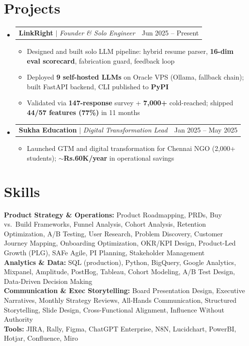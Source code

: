 \documentclass[a4paper,10pt]{article}
\makeatletter
\newcommand{\resumeItem}[1]{
  \item\small{#1\vspace{-2pt}}
}
\newcommand{\resumeProjectHeading}[2]{
  \item
  \begin{tabular*}{0.97\textwidth}{l@{\extracolsep{\fill}}r}
    \small#1 & #2 \\
  \end{tabular*}\vspace{-7pt}
}
\newcommand{\resumeSubHeadingListStart}{\begin{itemize}[leftmargin=0.15in, label={}]}
\newcommand{\resumeSubHeadingListEnd}{\end{itemize}}
\newcommand{\resumeItemListStart}{\begin{itemize}\parfillskip=0pt}
\newcommand{\resumeItemListEnd}{\end{itemize}\vspace{-5pt}}
\makeatother
\begin{document}
\section{Projects}
\resumeSubHeadingListStart

  \resumeProjectHeading
    {\textbf{LinkRight} $|$ \emph{Founder \& Solo Engineer}}{Jun 2025 -- Present}
  \resumeItemListStart
    \resumeItem{Designed and built solo LLM pipeline: hybrid resume parser, \textbf{16-dim eval scorecard}, fabrication guard, feedback loop}
    \resumeItem{Deployed \textbf{9 self-hosted LLMs} on Oracle VPS (Ollama, fallback chain); built FastAPI backend, CLI published to \textbf{PyPI}}
    \resumeItem{Validated via \textbf{147-response} survey + \textbf{7,000+} cold-reached; shipped \textbf{44/57 features (77\%)} in 11 months}
  \resumeItemListEnd

  \resumeProjectHeading
    {\textbf{Sukha Education} $|$ \emph{Digital Transformation Lead}}{Jan 2025 -- May 2025}
  \resumeItemListStart
    \resumeItem{Launched GTM and digital transformation for Chennai NGO (2,000+ students); \textbf{$\sim$Rs.60K/year} in operational savings}
  \resumeItemListEnd

\resumeSubHeadingListEnd

\section{Skills}
\begin{itemize}[leftmargin=0.15in, label={}]
  \small{\item{
    \textbf{Product Strategy \& Operations:}{ Product Roadmapping, PRDs, Buy vs.\ Build Frameworks, Funnel Analysis, Cohort Analysis, Retention Optimization, A/B Testing, User Research, Problem Discovery, Customer Journey Mapping, Onboarding Optimization, OKR/KPI Design, Product-Led Growth (PLG), SAFe Agile, PI Planning, Stakeholder Management} \\
    \textbf{Analytics \& Data:}{ SQL (production), Python, BigQuery, Google Analytics, Mixpanel, Amplitude, PostHog, Tableau, Cohort Modeling, A/B Test Design, Data-Driven Decision Making} \\
    \textbf{Communication \& Exec Storytelling:}{ Board Presentation Design, Executive Narratives, Monthly Strategy Reviews, All-Hands Communication, Structured Storytelling, Slide Design, Cross-Functional Alignment, Influence Without Authority} \\
    \textbf{Tools:}{ JIRA, Rally, Figma, ChatGPT Enterprise, N8N, Lucidchart, PowerBI, Hotjar, Confluence, Miro}
  }}
\end{itemize}
\end{document}

